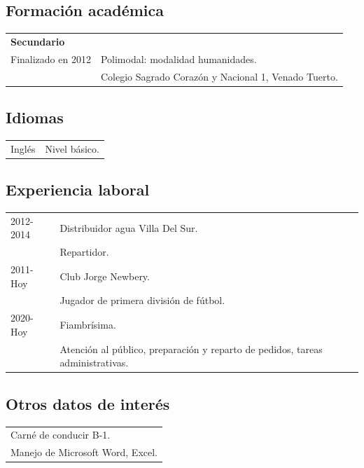 \documentclass[12pt]{article}
\begin{document}
\subsection*{Formación académica}
\begin{tabular}{l l}
  \multicolumn{1}{l}{\textbf{Secundario}}\\
  Finalizado en 2012&Polimodal: modalidad humanidades.\\
  &\small{Colegio Sagrado Corazón y Nacional 1, Venado Tuerto.}\\
\end{tabular}
\subsection*{Idiomas}
\begin{tabular}{l l}
  Inglés&Nivel básico.\\
\end{tabular}
\subsection*{Experiencia laboral}
\begin{tabular}{l l}
  2012-2014&Distribuidor agua Villa Del Sur.\\
           &\small{Repartidor.}\\
  2011-Hoy&Club Jorge Newbery.\\
           &\small{Jugador de primera división de fútbol.}\\
  2020-Hoy&Fiambrísima.\\
           &\small{Atención al público, preparación y reparto de pedidos, tareas administrativas.}
\end{tabular}
\subsection*{Otros datos de interés}
\begin{tabular}{l}
  Carné de conducir B-1.\\
  Manejo de Microsoft Word, Excel.
\end{tabular}
\end{document}
